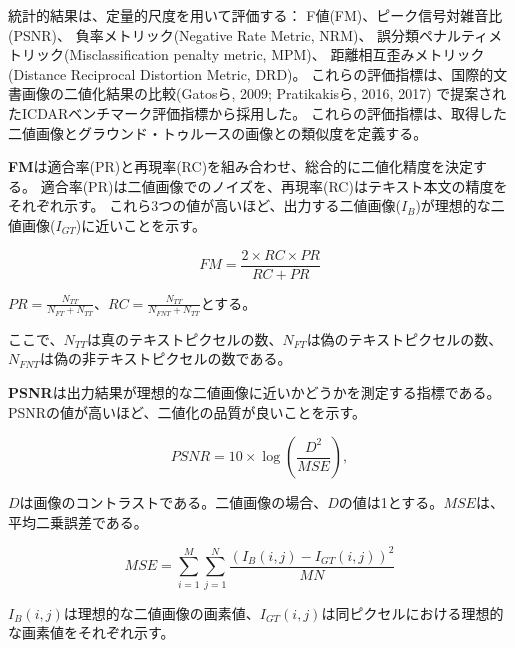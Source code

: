 \documentclass[uplatex, twocolumn,10pt]{jsarticle}
\begin{document}
統計的結果は、定量的尺度を用いて評価する：
F値(FM)、ピーク信号対雑音比(PSNR)、
負率メトリック(Negative Rate Metric, NRM)、
誤分類ペナルティメトリック(Misclassification penalty metric, MPM)、
距離相互歪みメトリック(Distance Reciprocal Distortion Metric, DRD)。
これらの評価指標は、国際的文書画像の二値化結果の比較(Gatosら, 2009; Pratikakisら, 2016, 2017)
で提案されたICDARベンチマーク評価指標から採用した。
これらの評価指標は、取得した二値画像とグラウンド・トゥルースの画像との類似度を定義する。

\textbf{FM}は適合率(PR)と再現率(RC)を組み合わせ、総合的に二値化精度を決定する。
適合率(PR)は二値画像でのノイズを、再現率(RC)はテキスト本文の精度をそれぞれ示す。
これら3つの値が高いほど、出力する二値画像($I_B$)が理想的な二値画像($I_{GT}$)に近いことを示す。

\begin{equation}\label{eq3}
    FM = \frac{2 \times RC \times PR}{RC + PR}
\end{equation}

$PR = \frac{N_{TT}}{N_{FT} + N_{TT}}$、$RC = \frac{N_{TT}}{N_{FNT} + N_{TT}}$とする。

ここで、$N_{TT}$は真のテキストピクセルの数、$N_{FT}$は偽のテキストピクセルの数、$N_{FNT}$は偽の非テキストピクセルの数である。

\textbf{PSNR}は出力結果が理想的な二値画像に近いかどうかを測定する指標である。
PSNRの値が高いほど、二値化の品質が良いことを示す。

\begin{equation}\label{eq4}
    PSNR = 10 \times \log (\frac{D^2}{MSE}),
\end{equation}

$D$は画像のコントラストである。二値画像の場合、$D$の値は1とする。$MSE$は、平均二乗誤差である。

\begin{equation}\label{eq5}
    MSE = \sum_{i=1}^M \sum_{j=1}^N \frac{ (I_B(i, j) - I_{GT}(i, j))^2 }{MN}
\end{equation}

$I_B(i, j)$は理想的な二値画像の画素値、$I_{GT}(i, j)$は同ピクセルにおける理想的な画素値をそれぞれ示す。
\end{document}
